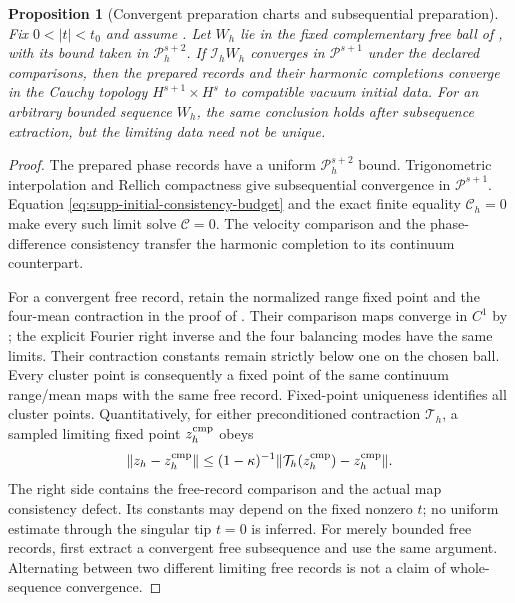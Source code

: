 \documentclass[11pt]{article}
\numberwithin{equation}{section}
\newtheorem{proposition}[proposition]{Proposition}
\theoremstyle{definition}
\theoremstyle{remark}
\begin{document}
\begin{proposition}[Convergent preparation charts and subsequential preparation]
\label{prop:supp-initial-cofinal-preparation}
Fix $0<|t|<t_0$ and assume .
Let $W_h$ lie in the fixed complementary free ball of
, with its bound taken in
$\mathcal P_h^{s+2}$.  If $\mathcal I_hW_h$ converges in
$\mathcal P^{s+1}$ under the declared comparisons, then the prepared
records and their harmonic completions converge in the Cauchy topology
$H^{s+1}\times H^s$ to compatible vacuum initial data.
For an arbitrary bounded sequence $W_h$, the same conclusion holds after
subsequence extraction, but the limiting data need not be unique.
\end{proposition}
\begin{proof}
The prepared phase records have a uniform $\mathcal P_h^{s+2}$ bound.
Trigonometric interpolation and Rellich compactness give subsequential
convergence in $\mathcal P^{s+1}$.  Equation
\eqref{eq:supp-initial-consistency-budget} and the exact finite equality
$\mathscr C_h=0$ make every such limit solve $\mathscr C=0$.
The velocity comparison and the phase-difference consistency transfer the
harmonic completion to its continuum counterpart.

For a convergent free record, retain the normalized range fixed point and
the four-mean contraction in the proof of
.  Their comparison maps converge in
$C^1$ by ; the explicit Fourier right
inverse and the four balancing modes have the same limits.  Their
contraction constants remain strictly below one on the chosen ball.
Every cluster point is consequently a fixed point of the same continuum
range/mean maps with the same free record.  Fixed-point uniqueness identifies
all cluster points.  Quantitatively, for either preconditioned contraction
$\mathcal T_h$, a sampled limiting fixed point $z^{\rm cmp}_h$ obeys
\[
 \|z_h-z^{\rm cmp}_h\|
 \le (1-\kappa)^{-1}
           \|\mathcal T_h(z^{\rm cmp}_h)-z^{\rm cmp}_h\|.
\]
The right side contains the free-record comparison and the actual map
consistency defect.  Its constants may depend on the fixed nonzero $t$;
no uniform estimate through the singular tip $t=0$ is inferred.
For merely bounded free records, first extract a convergent free subsequence
and use the same argument.  Alternating between two different limiting free
records is not a claim of whole-sequence convergence.
\end{proof}
\end{document}
